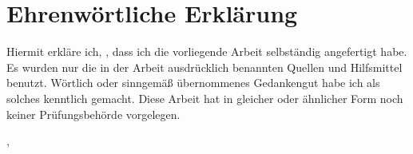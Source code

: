 \section*{Ehrenwörtliche Erklärung}

Hiermit erkläre ich, \Autor{}, dass ich die vorliegende Arbeit selbständig angefertigt habe. Es wurden nur die in der Arbeit ausdrücklich benannten Quellen und Hilfsmittel benutzt. Wörtlich oder sinngemäß übernommenes Gedankengut habe ich als solches kenntlich gemacht. Diese Arbeit hat in gleicher oder ähnlicher Form noch keiner Prüfungsbehörde vorgelegen.
\vspace{10mm}

\Ort, \Abgabedatum
\vspace{3mm}
\begin{flushleft}
   \AutorUnterschrift
\end{flushleft}
\vspace{-15mm} 
\underline{\hspace{8cm}}\\ \Autor
